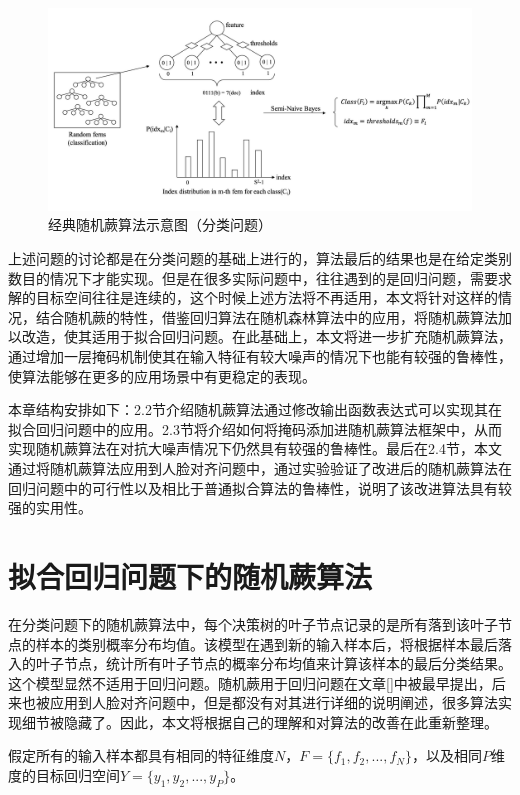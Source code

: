\begin{figure}[htb]
	\centering 
	\includegraphics[width=\textwidth]{./mypic/经典随机蕨算法的示意图.jpg} 
	\caption{经典随机蕨算法示意图（分类问题）} 
\end{figure}


上述问题的讨论都是在分类问题的基础上进行的，算法最后的结果也是在给定类别数目的情况下才能实现。但是在很多实际问题中，往往遇到的是回归问题，需要求解的目标空间往往是连续的，这个时候上述方法将不再适用，本文将针对这样的情况，结合随机蕨的特性，借鉴回归算法在随机森林算法中的应用，将随机蕨算法加以改造，使其适用于拟合回归问题。在此基础上，本文将进一步扩充随机蕨算法，通过增加一层掩码机制使其在输入特征有较大噪声的情况下也能有较强的鲁棒性，使算法能够在更多的应用场景中有更稳定的表现。

本章结构安排如下：2.2节介绍随机蕨算法通过修改输出函数表达式可以实现其在拟合回归问题中的应用。2.3节将介绍如何将掩码添加进随机蕨算法框架中，从而实现随机蕨算法在对抗大噪声情况下仍然具有较强的鲁棒性。最后在2.4节，本文通过将随机蕨算法应用到人脸对齐问题中，通过实验验证了改进后的随机蕨算法在回归问题中的可行性以及相比于普通拟合算法的鲁棒性，说明了该改进算法具有较强的实用性。

\section{拟合回归问题下的随机蕨算法}
在分类问题下的随机蕨算法中，每个决策树的叶子节点记录的是所有落到该叶子节点的样本的类别概率分布均值。该模型在遇到新的输入样本后，将根据样本最后落入的叶子节点，统计所有叶子节点的概率分布均值来计算该样本的最后分类结果。这个模型显然不适用于回归问题。随机蕨用于回归问题在文章[]中被最早提出，后来也被应用到人脸对齐问题中\cite{cao2014face}，但是都没有对其进行详细的说明阐述，很多算法实现细节被隐藏了。因此，本文将根据自己的理解和对算法的改善在此重新整理。

假定所有的输入样本都具有相同的特征维度$N$，$F=\{f_1,f_2,...,f_N\}$，以及相同$P$维度的目标回归空间$Y=\{y_1,y_2,...,y_P\}$。

